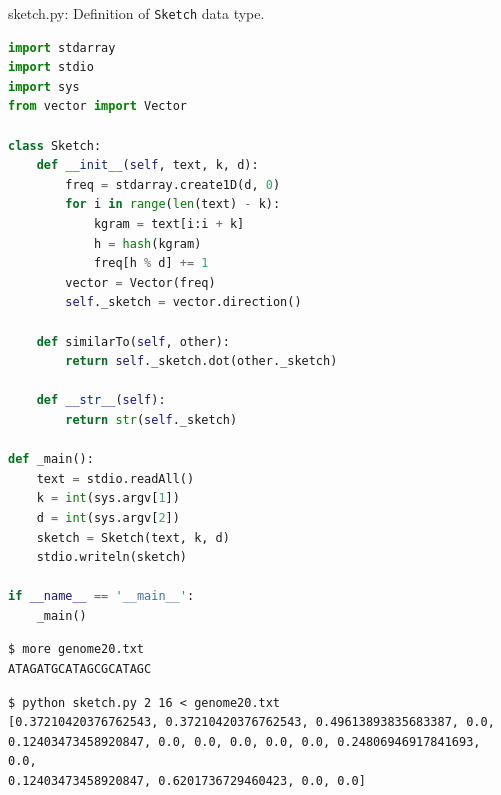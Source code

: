 \documentclass[8pt,a4paper,compress]{beamer}
\begin{document}
\begin{frame}[fragile]
\pause

\begin{framed}
\tiny sketch.py: Definition of \lstinline{Sketch} data type. 
\end{framed}

\begin{lstlisting}[language=Python]
import stdarray
import stdio
import sys
from vector import Vector

class Sketch:
    def __init__(self, text, k, d):
        freq = stdarray.create1D(d, 0)
        for i in range(len(text) - k):
            kgram = text[i:i + k]
            h = hash(kgram)
            freq[h % d] += 1
        vector = Vector(freq)
        self._sketch = vector.direction()

    def similarTo(self, other):
        return self._sketch.dot(other._sketch)

    def __str__(self):
        return str(self._sketch)

def _main():
    text = stdio.readAll()
    k = int(sys.argv[1])
    d = int(sys.argv[2])
    sketch = Sketch(text, k, d)
    stdio.writeln(sketch)

if __name__ == '__main__':
    _main()
\end{lstlisting}
\end{frame}

\begin{frame}[fragile]
\pause

\begin{lstlisting}[language={}]
$ more genome20.txt
ATAGATGCATAGCGCATAGC
\end{lstlisting}

\pause

\begin{lstlisting}[language={}]
$ python sketch.py 2 16 < genome20.txt 
[0.37210420376762543, 0.37210420376762543, 0.49613893835683387, 0.0, 
0.12403473458920847, 0.0, 0.0, 0.0, 0.0, 0.0, 0.24806946917841693, 0.0, 
0.12403473458920847, 0.6201736729460423, 0.0, 0.0]
\end{lstlisting}
\end{frame}
\end{document}

